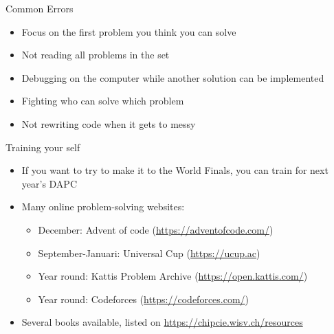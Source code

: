 \documentclass[11pt,pdf, aspectratio=169]{beamer}
\begin{document}
  \begin{frame}{Common Errors}
    \begin{itemize}
      \item Focus on the first problem you think you can solve
      \item Not reading all problems in the set
      \item Debugging on the computer while another solution can be implemented
      \item Fighting who can solve which problem
      \item Not rewriting code when it gets to messy
    \end{itemize}
  \end{frame}

  \begin{frame}{Training your self}
    \begin{itemize}
      \item If you want to try to make it to the World Finals, you can train for next year's DAPC
      \item Many online problem-solving websites:
      \begin{itemize}
        \item December: Advent of code (\url{https://adventofcode.com/})
        \item September-Januari: Universal Cup (\url{https://ucup.ac})
        \item Year round: Kattis Problem Archive (\url{https://open.kattis.com/})
        \item Year round: Codeforces (\url{https://codeforces.com/})
      \end{itemize}
      \item Several books available, listed on \url{https://chipcie.wisv.ch/resources}
    \end{itemize}
  \end{frame}
\end{document}
